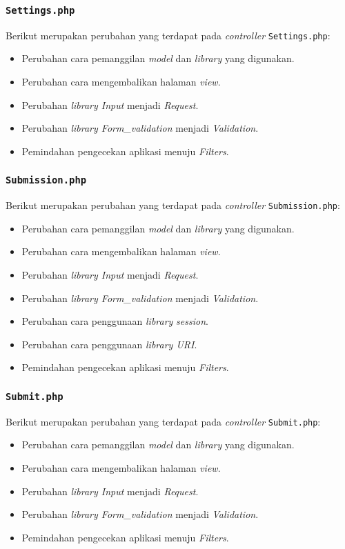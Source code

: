 \subsubsection{\texttt{Settings.php}}
Berikut merupakan perubahan yang terdapat pada \textit{controller} \texttt{Settings.php}:
\begin{itemize}
 	\item Perubahan cara pemanggilan \textit{model} dan \textit{library} yang digunakan.
	\item Perubahan cara mengembalikan halaman \textit{view}.
	\item Perubahan \textit{library Input} menjadi \textit{Request}.
	\item Perubahan \textit{library Form\_validation} menjadi \textit{Validation}.
	\item Pemindahan pengecekan aplikasi menuju \textit{Filters}.
\end{itemize}
\subsubsection{\texttt{Submission.php}}
Berikut merupakan perubahan yang terdapat pada \textit{controller} \texttt{Submission.php}:
\begin{itemize}
	\item Perubahan cara pemanggilan \textit{model} dan \textit{library} yang digunakan.
	\item Perubahan cara mengembalikan halaman \textit{view}.
	\item Perubahan \textit{library Input} menjadi \textit{Request}.
	\item Perubahan \textit{library Form\_validation} menjadi \textit{Validation}.
	\item Perubahan cara penggunaan \textit{library} \textit{session}.
	\item Perubahan cara penggunaan \textit{library URI}.
	\item Pemindahan pengecekan aplikasi menuju \textit{Filters}.
\end{itemize}
\subsubsection{\texttt{Submit.php}}
Berikut merupakan perubahan yang terdapat pada \textit{controller} \texttt{Submit.php}:
\begin{itemize}
	\item Perubahan cara pemanggilan \textit{model} dan \textit{library} yang digunakan.
	\item Perubahan cara mengembalikan halaman \textit{view}.
	\item Perubahan \textit{library Input} menjadi \textit{Request}.
	\item Perubahan \textit{library Form\_validation} menjadi \textit{Validation}.
	\item Pemindahan pengecekan aplikasi menuju \textit{Filters}.
\end{itemize}
